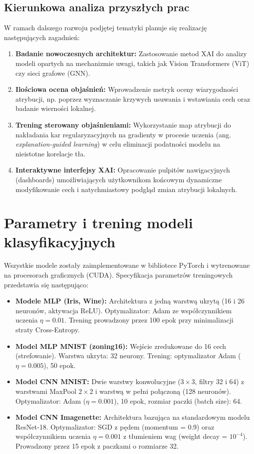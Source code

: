 \documentclass[10pt,journal,compsoc]{IEEEtran}
\begin{document}
\subsection{Kierunkowa analiza przyszłych prac}
W ramach dalszego rozwoju podjętej tematyki planuje się realizację następujących zagadnień:
\begin{enumerate}
    \item \textbf{Badanie nowoczesnych architektur:} Zastosowanie metod XAI do analizy modeli opartych na mechanizmie uwagi, takich jak Vision Transformers (ViT) czy sieci grafowe (GNN).
    \item \textbf{Ilościowa ocena objaśnień:} Wprowadzenie metryk oceny wiarygodności atrybucji, np. poprzez wyznaczanie krzywych usuwania i wstawiania cech oraz badanie wierności lokalnej.
    \item \textbf{Trening sterowany objaśnieniami:} Wykorzystanie map atrybucji do nakładania kar regularyzacyjnych na gradienty w procesie uczenia (ang. \textit{explanation-guided learning}) w celu eliminacji podatności modelu na nieistotne korelacje tła.
    \item \textbf{Interaktywne interfejsy XAI:} Opracowanie pulpitów nawigacyjnych (dashboards) umożliwiających użytkownikom końcowym dynamiczne modyfikowanie cech i natychmiastowy podgląd zmian atrybucji lokalnych.
\end{enumerate}


\appendices
\section{Parametry i trening modeli klasyfikacyjnych}
Wszystkie modele zostały zaimplementowane w bibliotece PyTorch i wytrenowane na procesorach graficznych (CUDA). Specyfikacja parametrów treningowych przedstawia się następująco:
\begin{itemize}
    \item \textbf{Modele MLP (Iris, Wine):} Architektura z jedną warstwą ukrytą (16 i 26 neuronów, aktywacja ReLU). Optymalizator: Adam ze współczynnikiem uczenia $\eta = 0.01$. Trening prowadzony przez 100 epok przy minimalizacji straty Cross-Entropy.
    \item \textbf{Model MLP MNIST (zoning16):} Wejście zredukowane do 16 cech (strefowanie). Warstwa ukryta: 32 neurony. Trening: optymalizator Adam ($\eta = 0.005$), 50 epok.
    \item \textbf{Model CNN MNIST:} Dwie warstwy konwolucyjne ($3 \times 3$, filtry 32 i 64) z warstwami MaxPool $2 \times 2$ i warstwą w pełni połączoną (128 neuronów). Optymalizator: Adam ($\eta = 0.001$), 10 epok, rozmiar paczki (batch size): 64.
    \item \textbf{Model CNN Imagenette:} Architektura bazująca na standardowym modelu ResNet-18. Optymalizator: SGD z pędem (momentum = 0.9) oraz współczynnikiem uczenia $\eta = 0.001$ z tłumieniem wag (weight decay = $10^{-4}$). Prowadzony przez 15 epok z paczkami o rozmiarze 32.
\end{itemize}
\end{document}
